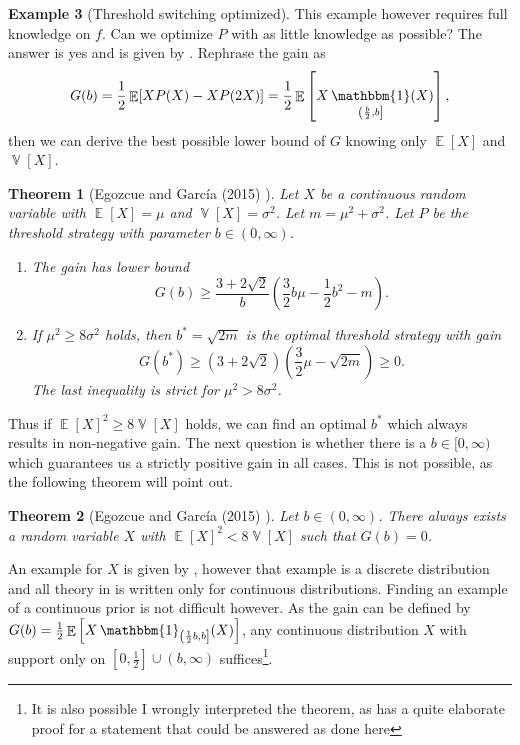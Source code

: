 \documentclass[twoside,a4paper]{article}
\theoremstyle{plain}
\newtheorem{theorem}{Theorem}[section]
\theoremstyle{definition}
\newtheorem{example}[theorem]{Example}
\theoremstyle{remark}
\numberwithin{equation}{section}
\DeclareMathOperator{\V}{\mathbb{V}}
\DeclareMathOperator{\E}{\mathbb{E}}
\DeclareMathOperator{\1}{\mathbbm{1}}
\begin{document}
\begin{example}[Threshold switching optimized]
This example however requires full knowledge on $f$. Can we optimize $P$ with as little knowledge as possible? The answer is yes and is given by \cite{Egozcue15}. Rephrase the gain as
\[G(b)=\frac{1}{2}\E[XP(X)-XP(2X)]=\frac{1}{2}\E\left[X\1_{\left(\frac{b}{2},b\right]}(X)\right],\]
then we can derive the best possible lower bound of $G$ knowing only $\E[X]$ and $\V[X]$.
\begin{theorem}[Egozcue and García (2015) \cite{Egozcue15}]
Let $X$ be a continuous random variable with $\E[X]=\mu$ and $\V[X]=\sigma^2$. Let $m=\mu^2+\sigma^2$. Let $P$ be the threshold strategy with parameter $b\in(0,\infty)$.
\begin{enumerate}
	\item The gain has lower bound 
	\[G(b)\geq\frac{3+2\sqrt{2}}{b}\left(\frac{3}{2}b\mu-\frac{1}{2}b^2-m\right).\]
	\item If $\mu^2\geq 8\sigma^2$ holds, then $b^*=\sqrt{2m}$ is the optimal threshold strategy with gain \[G(b^*)\geq(3+2\sqrt{2})\left(\frac{3}{2}\mu-\sqrt{2m}\right)\geq0.\] The last inequality is strict for $\mu^2>8\sigma^2$.
\end{enumerate}
\end{theorem}
Thus if $\E[X]^2\geq8\V[X]$ holds, we can find an optimal $b^*$ which always results in non-negative gain. The next question is whether there is a $b\in[0,\infty)$ which guarantees us a strictly positive gain in all cases. This is not possible, as the following theorem will point out.
\begin{theorem}[Egozcue and García (2015) \cite{Egozcue15}]
Let $b\in(0,\infty)$. There always exists a random variable $X$ with $\E[X]^2<8\V[X]$ such that $G(b)=0$.
\end{theorem}
An example for $X$ is given by \cite{Egozcue15}, however that example is a discrete distribution and all theory in \cite{Egozcue15,McDonnell09,McDonnell11} is written only for continuous distributions. Finding an example of a continuous prior is not difficult however. As the gain can be defined by $G(b)=\frac{1}{2}\E\left[X\1_{\left(\frac{1}{2}b,b\right]}(X)\right]$, any continuous distribution $X$ with support only on $\left[0,\frac{1}{2}\right]\cup(b,\infty)$ suffices\footnote{It is also possible I wrongly interpreted the theorem, as \cite{Egozcue15} has a quite elaborate proof for a statement that could be answered as done here}.
\end{example}
\end{document}
